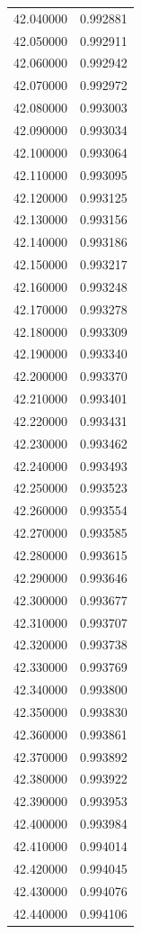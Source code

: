 \begin{tabular}{rr}
42.040000 & 0.992881 \\
42.050000 & 0.992911 \\
42.060000 & 0.992942 \\
42.070000 & 0.992972 \\
42.080000 & 0.993003 \\
42.090000 & 0.993034 \\
42.100000 & 0.993064 \\
42.110000 & 0.993095 \\
42.120000 & 0.993125 \\
42.130000 & 0.993156 \\
42.140000 & 0.993186 \\
42.150000 & 0.993217 \\
42.160000 & 0.993248 \\
42.170000 & 0.993278 \\
42.180000 & 0.993309 \\
42.190000 & 0.993340 \\
42.200000 & 0.993370 \\
42.210000 & 0.993401 \\
42.220000 & 0.993431 \\
42.230000 & 0.993462 \\
42.240000 & 0.993493 \\
42.250000 & 0.993523 \\
42.260000 & 0.993554 \\
42.270000 & 0.993585 \\
42.280000 & 0.993615 \\
42.290000 & 0.993646 \\
42.300000 & 0.993677 \\
42.310000 & 0.993707 \\
42.320000 & 0.993738 \\
42.330000 & 0.993769 \\
42.340000 & 0.993800 \\
42.350000 & 0.993830 \\
42.360000 & 0.993861 \\
42.370000 & 0.993892 \\
42.380000 & 0.993922 \\
42.390000 & 0.993953 \\
42.400000 & 0.993984 \\
42.410000 & 0.994014 \\
42.420000 & 0.994045 \\
42.430000 & 0.994076 \\
42.440000 & 0.994106 \\

\end{tabular}
